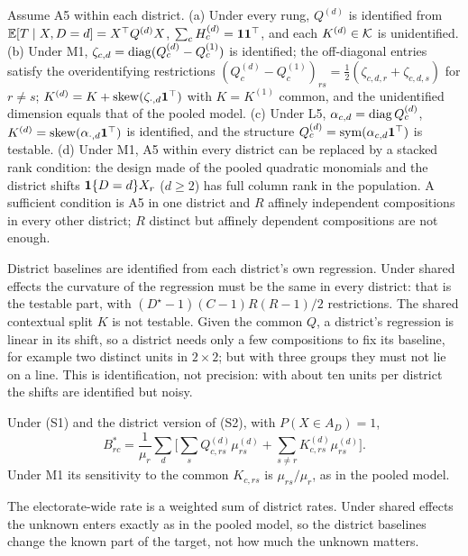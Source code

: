 \begin{lemma}\label{lem:D1}
Assume A5 within each district.
(a) Under every rung, $Q^{(d)}$ is identified from $\mathbb E[T\mid X,D=d]=X^\top Q^{(d)}X$,
$\sum_cH^{(d)}_c=\mathbf 1\mathbf 1^\top$, and each $K^{(d)}\in\mathcal K$ is unidentified.
(b) Under M1, $\zeta_{c,d}=\operatorname{diag}(Q^{(d)}_c-Q^{(1)}_c)$ is identified; the
off-diagonal entries satisfy the overidentifying restrictions
$(Q^{(d)}_c-Q^{(1)}_c)_{rs}=\tfrac12(\zeta_{c,d,r}+\zeta_{c,d,s})$ for $r\neq s$;
$K^{(d)}=K+\operatorname{skew}(\zeta_{\cdot,d}\mathbf 1^\top)$ with $K=K^{(1)}$ common, and the
unidentified dimension equals that of the pooled model.
(c) Under L5, $\alpha_{c,d}=\operatorname{diag} Q^{(d)}_c$, $K^{(d)}=\operatorname{skew}(\alpha_{\cdot,d}\mathbf 1^\top)$
is identified, and the structure $Q^{(d)}_c=\operatorname{sym}(\alpha_{c,d}\mathbf 1^\top)$ is testable.
(d) Under M1, A5 within every district can be replaced by a stacked rank
condition: the design made of the pooled quadratic monomials and the district
shifts $\mathbf 1\{D=d\}X_r$ ($d\ge2$) has full column rank in the population. A
sufficient condition is A5 in one district and $R$ affinely independent
compositions in every other district; $R$ distinct but affinely dependent
compositions are not enough.
\end{lemma}
\begin{reading}
District baselines are identified from each district's own regression. Under
shared effects the curvature of the regression must be the same in every
district: that is the testable part, with $(D^\star-1)(C-1)R(R-1)/2$
restrictions. The shared contextual split $K$ is not testable. Given the common
$Q$, a district's regression is linear in its shift, so a district needs only a
few compositions to fix its baseline, for example two distinct units in
$2\times2$; but with three groups they must not lie on a line. This is
identification, not precision: with about ten units per district the shifts are
identified but noisy.
\end{reading}

\begin{lemma}\label{lem:D2}
Under (S1) and the district version of (S2), with $P(X\in A_D)=1$,
\[
B^*_{rc}=\frac1{\mu_r}\sum_d\Big[\sum_sQ^{(d)}_{c,rs}\mu^{(d)}_{rs}+\sum_{s\ne r}K^{(d)}_{c,rs}\mu^{(d)}_{rs}\Big].
\]
Under M1 its sensitivity to the common $K_{c,rs}$ is $\mu_{rs}/\mu_r$, as in the
pooled model.
\end{lemma}
\begin{reading}
The electorate-wide rate is a weighted sum of district rates. Under shared
effects the unknown enters exactly as in the pooled model, so the district
baselines change the known part of the target, not how much the unknown matters.
\end{reading}

